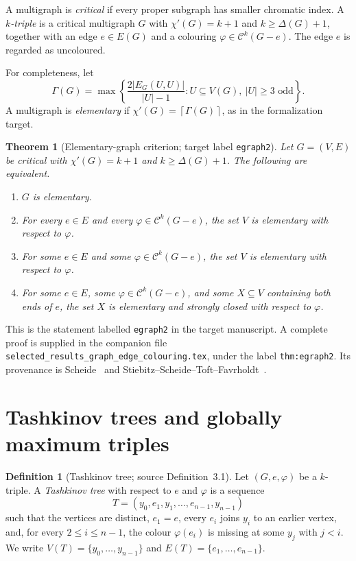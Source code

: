 \documentclass[11pt]{article}
\newtheorem{theorem}{Theorem}[section]
\theoremstyle{definition}
\newtheorem{definition}[definition]{Definition}
\newcommand{\Ccal}{\mathcal C}
\newcommand{\set}[1]{\{#1\}}
\newcommand{\ceil}[1]{\left\lceil #1\right\rceil}
\newcommand{\target}[1]{\texttt{#1}}
\begin{document}
A multigraph is \emph{critical} if every proper subgraph has smaller chromatic
index. A \emph{$k$-triple} is a critical multigraph $G$ with
$\chi'(G)=k+1$ and $k\ge\Delta(G)+1$, together with an edge $e\in E(G)$ and a
colouring $\varphi\in\Ccal^k(G-e)$. The edge $e$ is regarded as uncoloured.

For completeness, let
\[
 \Gamma(G)=\max\left\{\frac{2|E_G(U,U)|}{|U|-1}:
 U\subseteq V(G),\ |U|\ge3\text{ odd}\right\}.
\]
A multigraph is \emph{elementary} if
$\chi'(G)=\ceil{\Gamma(G)}$, as in the formalization target.

\setcounter{theorem}{7}
\begin{theorem}[Elementary-graph criterion; target label \target{egraph2}]
\label{egraph2}\label{Scheide-Theorem-2.8}
Let $G=(V,E)$ be critical with $\chi'(G)=k+1$ and
$k\ge\Delta(G)+1$. The following are equivalent.
\begin{enumerate}[label=\textup{(\roman*)}]
\item $G$ is elementary.
\item For every $e\in E$ and every $\varphi\in\Ccal^k(G-e)$, the set $V$ is
      elementary with respect to $\varphi$.
\item For some $e\in E$ and some $\varphi\in\Ccal^k(G-e)$, the set $V$ is
      elementary with respect to $\varphi$.
\item For some $e\in E$, some $\varphi\in\Ccal^k(G-e)$, and some
      $X\subseteq V$ containing both ends of $e$, the set $X$ is elementary
      and strongly closed with respect to $\varphi$.
\end{enumerate}
\end{theorem}

This is the statement labelled \target{egraph2} in the target manuscript.
A complete proof is supplied in the companion file
\texttt{selected\_results\_graph\_edge\_colouring.tex}, under the label
\texttt{thm:egraph2}. Its provenance is Scheide~\cite[Theorem~2.8]{S} and
Stiebitz--Scheide--Toft--Favrholdt~\cite[Theorem~1.4]{SSTF}.

\section{Tashkinov trees and globally maximum triples}

\setcounter{theorem}{0}
\begin{definition}[Tashkinov tree; source Definition~3.1]
\label{Scheide-Definition-3.1}
Let $(G,e,\varphi)$ be a $k$-triple. A \emph{Tashkinov tree} with respect
to $e$ and $\varphi$ is a sequence
\[
 T=(y_0,e_1,y_1,\ldots,e_{n-1},y_{n-1})
\]
such that the vertices are distinct, $e_1=e$, every $e_i$ joins $y_i$ to an
earlier vertex, and, for every $2\le i\le n-1$, the colour
$\varphi(e_i)$ is missing at some $y_j$ with $j<i$. We write
$V(T)=\set{y_0,\ldots,y_{n-1}}$ and
$E(T)=\set{e_1,\ldots,e_{n-1}}$.
\end{definition}
\end{document}
